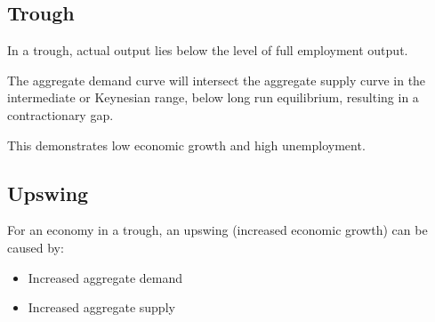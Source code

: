 \documentclass[a4paper,11pt]{article}
\begin{document}
\subsection{Trough}

In a trough, actual output lies below the level of full employment output.

The aggregate demand curve will intersect the aggregate supply curve in the
intermediate or Keynesian range, below long run equilibrium, resulting in a
contractionary gap.

This demonstrates low economic growth and high unemployment.


\subsection{Upswing}

For an economy in a trough, an upswing (increased economic growth) can be
caused by:

\begin{itemize}
\item Increased aggregate demand
\item Increased aggregate supply
\end{itemize}
\end{document}

